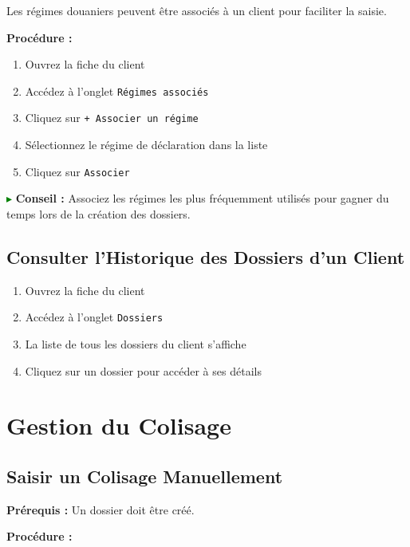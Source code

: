 \documentclass[12pt,a4paper]{report}
\begin{document}
Les régimes douaniers peuvent être associés à un client pour faciliter la saisie.

\textbf{Procédure :}

\begin{enumerate}[leftmargin=*]
    \item Ouvrez la fiche du client
    \item Accédez à l'onglet \texttt{Régimes associés}
    \item Cliquez sur \texttt{+ Associer un régime}
    \item Sélectionnez le régime de déclaration dans la liste
    \item Cliquez sur \texttt{Associer}
\end{enumerate}

\textcolor{green}{$\blacktriangleright$} \textbf{Conseil :} Associez les régimes les plus fréquemment utilisés pour gagner du temps lors de la création des dossiers.

\subsection{Consulter l'Historique des Dossiers d'un Client}

\begin{enumerate}[leftmargin=*]
    \item Ouvrez la fiche du client
    \item Accédez à l'onglet \texttt{Dossiers}
    \item La liste de tous les dossiers du client s'affiche
    \item Cliquez sur un dossier pour accéder à ses détails
\end{enumerate}

\section{Gestion du Colisage}

\subsection{Saisir un Colisage Manuellement}

\textbf{Prérequis :} Un dossier doit être créé.

\textbf{Procédure :}
\end{document}
